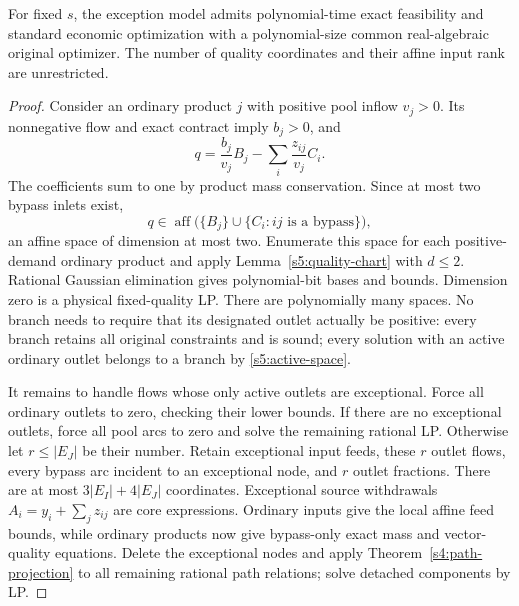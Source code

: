 \begin{theorem}
\label{s5:arbitrary-exceptions}
For fixed $s$, the exception model admits polynomial-time exact
feasibility and standard economic optimization with a polynomial-size
common real-algebraic original optimizer. The number of quality
coordinates and their affine input rank are unrestricted.
\end{theorem}
\begin{proof}
Consider an ordinary product $j$ with positive pool inflow $v_j>0$.
Its nonnegative flow and exact contract imply $b_j>0$, and
\[
 q=\frac{b_j}{v_j}B_j-\sum_i\frac{z_{ij}}{v_j}C_i.
\]
The coefficients sum to one by product mass conservation. Since at most
two bypass inlets exist,
\begin{equation}
 q\in\operatorname{aff}\bigl(\{B_j\}\cup
                    \{C_i:ij\text{ is a bypass}\}\bigr),
 \label{s5:active-space}
\end{equation}
an affine space of dimension at most two. Enumerate this space for each
positive-demand ordinary product and apply
Lemma~\ref{s5:quality-chart} with $d\le2$. Rational Gaussian elimination
gives polynomial-bit bases and bounds. Dimension zero is a physical
fixed-quality LP. There are polynomially many spaces. No branch needs
to require that its designated outlet actually be positive: every
branch retains all original constraints and is sound; every solution
with an active ordinary outlet belongs to a branch by
\eqref{s5:active-space}.

It remains to handle flows whose only active outlets are exceptional.
Force all ordinary outlets to zero, checking their lower bounds.
If there are no exceptional outlets, force all pool arcs to zero and
solve the remaining rational LP. Otherwise let $r\le|E_J|$ be their
number. Retain exceptional input feeds, these $r$ outlet flows, every
bypass arc incident to an exceptional node, and $r$ outlet fractions.
There are at most $3|E_I|+4|E_J|$ coordinates. Exceptional source
withdrawals $A_i=y_i+\sum_jz_{ij}$ are core expressions. Ordinary
inputs give the local affine feed bounds, while ordinary products now
give bypass-only exact mass and vector-quality equations. Delete the
exceptional nodes and apply Theorem~\ref{s4:path-projection} to all
remaining rational path relations; solve detached components by LP.


\end{proof}
